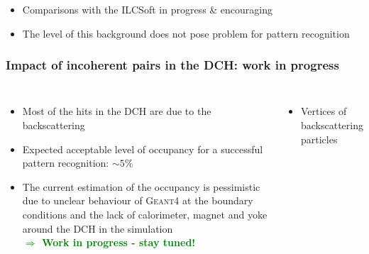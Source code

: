 \documentclass[aspectratio=169, hyperref={colorlinks=true,pdfpagelabels=false,linkcolor=black}, xcolor=dvipsnames,10pt]{beamer}
\begin{document}
\begin{frame}
	\begin{itemize}
	\item Comparisons with the ILCSoft in progress \& encouraging
	\item The level of this background does not pose problem for pattern recognition
	\end{itemize}	
	
\end{frame}


\begin{frame}
	\frametitle{Impact of incoherent pairs in the DCH: work in progress}

	\begin{columns}[t]
		\begin{itemize}
		\item Most of the hits in the DCH are due to the backscattering   \vspace{0.2cm}
		\item Expected acceptable level of occupancy for a successful pattern recognition: $\sim5\%$ \vspace{0.2cm}

		\item The current estimation of the occupancy is pessimistic due to unclear behaviour of \textsc{Geant4} at the boundary conditions and the lack of calorimeter, magnet and yoke around the DCH in the simulation \\ \vspace{1cm}
		\textbf{\textcolor{Green}{$\Rightarrow$ Work in progress - stay tuned!}}
		\end{itemize}	
	
	
	\begin{itemize}
	\item Vertices of backscattering particles
	\end{itemize}
	\centering


\end{columns}
\end{frame}
\end{document}
